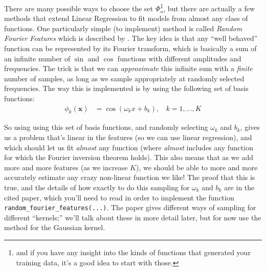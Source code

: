 \documentclass{article} %
\begin{document}
There are many possible ways to choose the set \(\Phi\)\footnote{and if you have any insight into the kinds of functions that 
generated your training data, it's a good idea to start with those.}, but there are actually a few methods that extend Linear 
Regression to fit models from almost any class of functions. One particularly simple (to implement) method is called 
\emph{Random Fourier Features} which is described by \citet{rff-cite}. The key idea is that any ``well behaved'' function can 
be represented by its Fourier transform, which is basically a sum of an infinite number of \(\sin\) and \(\cos\) functions 
with different amplitudes and frequencies. The trick is that we can \emph{approximate} this infinite sum with a \emph{finite} 
number of samples, as long as we sample appropriately at randomly selected frequencies. The way this is implemented is by 
using the following set of basis functions:
\begin{align*}
	\phi_k(\mathbf{x}) &= \cos(\omega_k x + b_k),~~~~k=1,\ldots,K
\end{align*}

So using using this set of basis functions, and randomly selecting \(\omega_k\) and \(b_k\), gives us a problem that's linear 
in the features (so we can use linear regression), and which should let us fit \emph{almost} any function (where \emph{almost}
includes any function for which the Fourier inversion theorem holds). 
This also means that as we add more and more features (as we increase \(K\)), we should be able to more and more accurately 
estimate any crazy non-linear function we like! The proof that this is true, and the  details of how exactly to do this 
sampling for \(\omega_k\) and \(b_k\) are in the cited paper, which you'll need to read in order to implement the function 
\texttt{random\_fourier\_features(...)}. The paper gives different ways of sampling for different ``kernels;'' we'll talk 
about these in more detail later, but for now use the method for the Gaussian kernel. 
\end{document}
